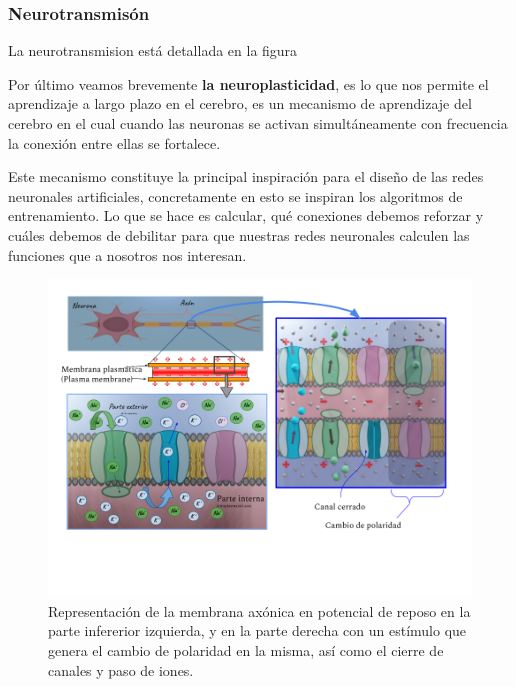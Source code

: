 \subsubsection{Neurotransmisón}


La neurotransmision está detallada en la figura  


Por último veamos brevemente \textbf{la neuroplasticidad}, es lo que nos permite el aprendizaje a largo plazo en el cerebro, es un mecanismo de aprendizaje del cerebro en el cual cuando las neuronas se activan simultáneamente con frecuencia la conexión entre ellas se fortalece.


Este mecanismo constituye la principal inspiración para el diseño de las redes neuronales artificiales, concretamente en esto se inspiran los algoritmos de entrenamiento. Lo que se hace es calcular, qué conexiones debemos reforzar y cuáles debemos de debilitar para que nuestras redes neuronales calculen las funciones que a nosotros nos interesan.


\begin{figure}[h]
 \centering
 \includegraphics[scale=0.5]{../Figuras/MembranaP.png}
 \caption{Representación de la membrana axónica en potencial de reposo en la parte infererior izquierda, y en la parte derecha con un estímulo que genera el cambio de polaridad en la misma, así como el cierre de canales y paso de iones.}
 \label{fig:MembranaP}
\end{figure}









